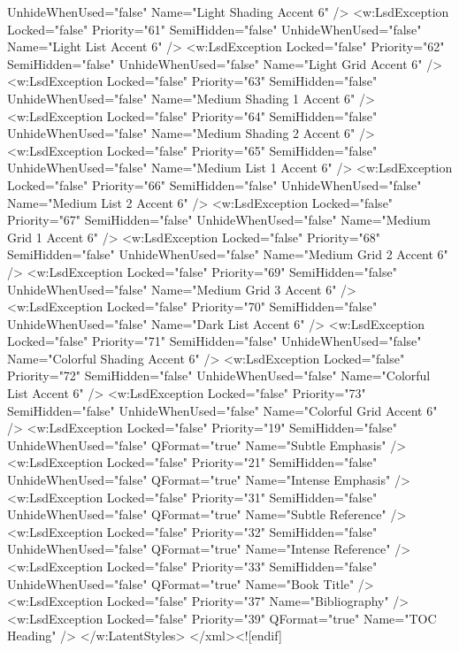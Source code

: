 UnhideWhenUsed="false" Name="Light Shading Accent 6" /> <w:LsdException Locked="false" Priority="61" SemiHidden="false"    UnhideWhenUsed="false" Name="Light List Accent 6" /> <w:LsdException Locked="false" Priority="62" SemiHidden="false"    UnhideWhenUsed="false" Name="Light Grid Accent 6" /> <w:LsdException Locked="false" Priority="63" SemiHidden="false"    UnhideWhenUsed="false" Name="Medium Shading 1 Accent 6" /> <w:LsdException Locked="false" Priority="64" SemiHidden="false"    UnhideWhenUsed="false" Name="Medium Shading 2 Accent 6" /> <w:LsdException Locked="false" Priority="65" SemiHidden="false"    UnhideWhenUsed="false" Name="Medium List 1 Accent 6" /> <w:LsdException Locked="false" Priority="66" SemiHidden="false"    UnhideWhenUsed="false" Name="Medium List 2 Accent 6" /> <w:LsdException Locked="false" Priority="67" SemiHidden="false"    UnhideWhenUsed="false" Name="Medium Grid 1 Accent 6" /> <w:LsdException Locked="false" Priority="68" SemiHidden="false"    UnhideWhenUsed="false" Name="Medium Grid 2 Accent 6" /> <w:LsdException Locked="false" Priority="69" SemiHidden="false"    UnhideWhenUsed="false" Name="Medium Grid 3 Accent 6" /> <w:LsdException Locked="false" Priority="70" SemiHidden="false"    UnhideWhenUsed="false" Name="Dark List Accent 6" /> <w:LsdException Locked="false" Priority="71" SemiHidden="false"    UnhideWhenUsed="false" Name="Colorful Shading Accent 6" /> <w:LsdException Locked="false" Priority="72" SemiHidden="false"    UnhideWhenUsed="false" Name="Colorful List Accent 6" /> <w:LsdException Locked="false" Priority="73" SemiHidden="false"    UnhideWhenUsed="false" Name="Colorful Grid Accent 6" /> <w:LsdException Locked="false" Priority="19" SemiHidden="false"    UnhideWhenUsed="false" QFormat="true" Name="Subtle Emphasis" /> <w:LsdException Locked="false" Priority="21" SemiHidden="false"    UnhideWhenUsed="false" QFormat="true" Name="Intense Emphasis" /> <w:LsdException Locked="false" Priority="31" SemiHidden="false"    UnhideWhenUsed="false" QFormat="true" Name="Subtle Reference" /> <w:LsdException Locked="false" Priority="32" SemiHidden="false"    UnhideWhenUsed="false" QFormat="true" Name="Intense Reference" /> <w:LsdException Locked="false" Priority="33" SemiHidden="false"    UnhideWhenUsed="false" QFormat="true" Name="Book Title" /> <w:LsdException Locked="false" Priority="37" Name="Bibliography" /> <w:LsdException Locked="false" Priority="39" QFormat="true" Name="TOC Heading" /> </w:LatentStyles> </xml><![endif]


